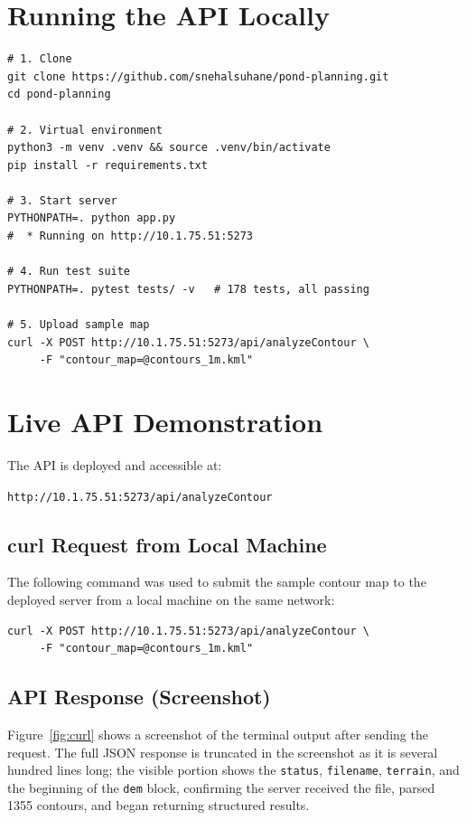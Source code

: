 \documentclass[12pt,a4paper]{article}
\begin{document}
\section{Running the API Locally}

\begin{lstlisting}[style=bash]
# 1. Clone
git clone https://github.com/snehalsuhane/pond-planning.git
cd pond-planning

# 2. Virtual environment
python3 -m venv .venv && source .venv/bin/activate
pip install -r requirements.txt

# 3. Start server
PYTHONPATH=. python app.py
#  * Running on http://10.1.75.51:5273

# 4. Run test suite
PYTHONPATH=. pytest tests/ -v   # 178 tests, all passing

# 5. Upload sample map
curl -X POST http://10.1.75.51:5273/api/analyzeContour \
     -F "contour_map=@contours_1m.kml"
\end{lstlisting}

\section{Live API Demonstration}

The API is deployed and accessible at:

\begin{center}
    \large\texttt{http://10.1.75.51:5273/api/analyzeContour}
\end{center}

\subsection{curl Request from Local Machine}

The following command was used to submit the sample contour map to the deployed server from a local machine on the same network:

\begin{lstlisting}[style=bash]
curl -X POST http://10.1.75.51:5273/api/analyzeContour \
     -F "contour_map=@contours_1m.kml"
\end{lstlisting}

\subsection{API Response (Screenshot)}

Figure~\ref{fig:curl} shows a screenshot of the terminal output after sending the request. The full JSON response is truncated in the screenshot as it is several hundred lines long; the visible portion shows the \texttt{status}, \texttt{filename}, \texttt{terrain}, and the beginning of the \texttt{dem} block, confirming the server received the file, parsed 1355 contours, and began returning structured results.
\end{document}
